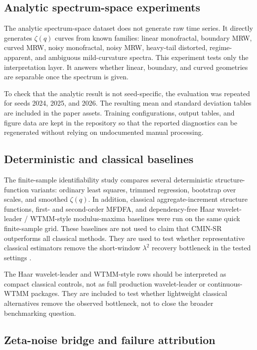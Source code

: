\subsection{Analytic spectrum-space experiments}

The analytic spectrum-space dataset does not generate raw time series. It
directly generates \(\zeta(q)\) curves from known families: linear
monofractal, boundary MRW, curved MRW, noisy monofractal, noisy MRW,
heavy-tail distorted, regime-apparent, and ambiguous mild-curvature spectra.
This experiment tests only the interpretation layer. It answers whether
linear, boundary, and curved geometries are separable once the spectrum is
given.

To check that the analytic result is not seed-specific, the evaluation was
repeated for seeds 2024, 2025, and 2026. The resulting mean and standard
deviation tables are included in the paper assets.
Training configurations, output tables, and figure data are kept in the
repository so that the reported diagnostics can be regenerated without relying
on undocumented manual processing.

\subsection{Deterministic and classical baselines}

The finite-sample identifiability study compares several deterministic
structure-function variants: ordinary least squares, trimmed regression,
bootstrap over scales, and smoothed \(\zeta(q)\). In addition, classical
aggregate-increment structure functions, first- and second-order MFDFA, and
dependency-free Haar wavelet-leader / WTMM-style modulus-maxima baselines were
run on the same quick finite-sample grid. These baselines are not used to
claim that CMIN-SR outperforms all classical methods. They are used to test
whether representative classical estimators remove the short-window
\(\lambda^2\) recovery bottleneck in the tested settings
\cite{muzy1993multifractal,kantelhardt2002mfdfa,jaffard2007wavelet,wendt2007bootstrap}.

The Haar wavelet-leader and WTMM-style rows should be interpreted as compact
classical controls, not as full production wavelet-leader or continuous-WTMM
packages. They are included to test whether lightweight classical alternatives
remove the observed bottleneck, not to close the broader benchmarking question.

\subsection{Zeta-noise bridge and failure attribution}

